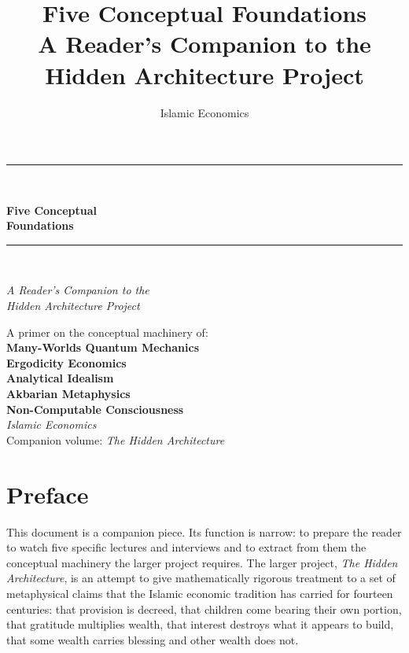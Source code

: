 \documentclass[11pt,a4paper]{book}
\title{\Huge\textbf{Five Conceptual Foundations}\\[0.4em]
    \LARGE A Reader's Companion to the Hidden Architecture Project}
\author{\Large Islamic Economics}
\date{}
\theoremstyle{cleanrm}
\begin{document}

\frontmatter

\begin{titlepage}
\centering
\vspace*{2cm}
{\color{themegreen}\rule{0.5\textwidth}{1pt}}\\[1em]
{\Huge\bfseries\color{themegreen} Five Conceptual\\[0.2em] Foundations\par}
\vspace{1em}
{\color{themegold}\rule{0.3\textwidth}{0.5pt}}\\[1em]
{\Large\itshape A Reader's Companion to the\\ Hidden Architecture Project\par}
\vspace{4cm}
{\large
A primer on the conceptual machinery of:\\[0.5em]
\textbf{Many-Worlds Quantum Mechanics}\\
\textbf{Ergodicity Economics}\\
\textbf{Analytical Idealism}\\
\textbf{Akbarian Metaphysics}\\
\textbf{Non-Computable Consciousness}\\
}
\vfill
{\large \textit{Islamic Economics}}\\[0.3em]
{\small Companion volume: \emph{The Hidden Architecture}}
\end{titlepage}

\tableofcontents
\cleardoublepage

\chapter*{Preface}

This document is a companion piece. Its function is narrow: to prepare
the reader to watch five specific lectures and interviews and to extract
from them the conceptual machinery the larger project requires. The
larger project, \emph{The Hidden Architecture}, is an attempt to give
mathematically rigorous treatment to a set of metaphysical claims that
the Islamic economic tradition has carried for fourteen centuries: that
provision is decreed, that children come bearing their own portion,
that gratitude multiplies wealth, that interest destroys what it appears
to build, that some wealth carries blessing and other wealth does not.
\end{document}
